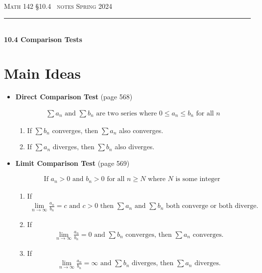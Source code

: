 \documentclass{article}
\def\chapt{10.4}
\begin{document}
\noindent
{\scshape Math 142} \hfill {\scshape \S\chapt~ notes} \hfill {\scshape Spring 2024}

\smallskip

\hrule

\bigskip

\hfill
\\

{
\huge
\noindent
\textbf{10.4 Comparison Tests}
}

\section*{Main Ideas}

\begin{itemize}

% 
%
%
%
\item
\textbf{Direct Comparison Test} (page 568)

\begin{gather*}
\sum a_n
\text{ and }
\sum b_n
\text{ are two series where }
0 \leq a_n \leq b_n
\text{ for all }
n
\end{gather*}

\begin{enumerate}
\item
If $\sum b_n$ converges, then $\sum a_n$ also converges.
\item
If $\sum a_n$ diverges, then $\sum b_n$ also diverges.
\end{enumerate}
\hfill
%
%
%
%
\item
\textbf{Limit Comparison Test} (page 569)

\begin{gather*}
\text{If }
a_n > 0
\text{ and }
b_n > 0
\text{ for all }
n \geq N
\text{ where $N$ is some integer }
\end{gather*}

\begin{enumerate}
\item
If
\begin{gather*}
\lim_{n\to\infty} \frac{a_n}{b_n}=c \text{ and } c>0
\text{ then }
\sum a_n
\text{ and }
\sum b_n
\text{ both converge or both diverge.}
\end{gather*}
\item

If
\begin{gather*}
\lim_{n\to\infty} \frac{a_n}{b_n}=0
\text{ and }
\sum b_n
\text{ converges, then }
\sum a_n
\text{ converges.}
\end{gather*}
\item

If
\begin{gather*}
\lim_{n\to\infty} \frac{a_n}{b_n}=\infty
\text{ and }
\sum b_n
\text{ diverges, then }
\sum a_n
\text{ diverges.}
\end{gather*}
\end{enumerate}

\end{itemize}
\end{document}
